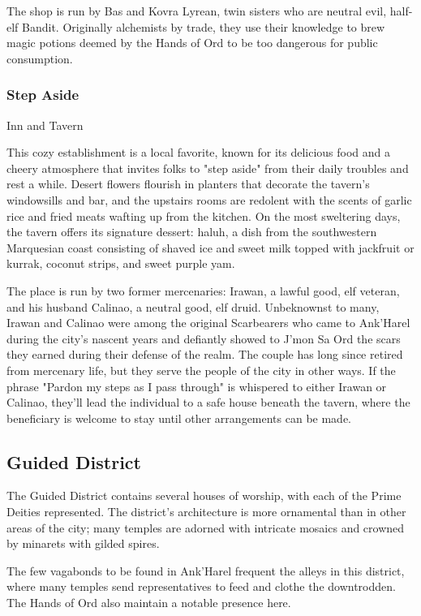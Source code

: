 \documentclass[10pt,a4paper,twoside,bg=print,twocolumn,openany,nodeprecatedcode]{dndbook}
\begin{document}
The shop is run by Bas and Kovra Lyrean, twin sisters who are neutral evil, half-elf Bandit. Originally alchemists by trade, they use their knowledge to brew magic potions deemed by the Hands of Ord to be too dangerous for public consumption.

\subsubsection{Step Aside}
Inn and Tavern

This cozy establishment is a local favorite, known for its delicious food and a cheery atmosphere that invites folks to "step aside" from their daily troubles and rest a while. Desert flowers flourish in planters that decorate the tavern's windowsills and bar, and the upstairs rooms are redolent with the scents of garlic rice and fried meats wafting up from the kitchen. On the most sweltering days, the tavern offers its signature dessert: haluh, a dish from the southwestern Marquesian coast consisting of shaved ice and sweet milk topped with jackfruit or kurrak, coconut strips, and sweet purple yam.

The place is run by two former mercenaries: Irawan, a lawful good, elf veteran, and his husband Calinao, a neutral good, elf druid. Unbeknownst to many, Irawan and Calinao were among the original Scarbearers who came to Ank'Harel during the city's nascent years and defiantly showed to J'mon Sa Ord the scars they earned during their defense of the realm. The couple has long since retired from mercenary life, but they serve the people of the city in other ways. If the phrase "Pardon my steps as I pass through" is whispered to either Irawan or Calinao, they'll lead the individual to a safe house beneath the tavern, where the beneficiary is welcome to stay until other arrangements can be made.



\subsection{Guided District}
The Guided District contains several houses of worship, with each of the Prime Deities represented. The district's architecture is more ornamental than in other areas of the city; many temples are adorned with intricate mosaics and crowned by minarets with gilded spires.

The few vagabonds to be found in Ank'Harel frequent the alleys in this district, where many temples send representatives to feed and clothe the downtrodden. The Hands of Ord also maintain a notable presence here.
\end{document}
